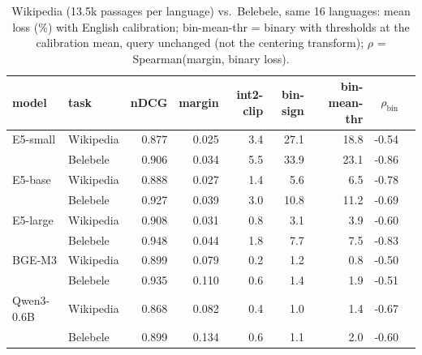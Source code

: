 \begin{table}[t]\centering\footnotesize
\begin{tabular}{llrrrrrrr}
\toprule
model & task & nDCG & margin & int2-clip & bin-sign & bin-mean-thr & $\rho_{\mathrm{bin}}$ \\
\midrule
E5-small & Wikipedia & 0.877 & 0.025 & 3.4 & 27.1 & 18.8 & -0.54 \\
 & Belebele & 0.906 & 0.034 & 5.5 & 33.9 & 23.1 & -0.86 \\
E5-base & Wikipedia & 0.888 & 0.027 & 1.4 & 5.6 & 6.5 & -0.78 \\
 & Belebele & 0.927 & 0.039 & 3.0 & 10.8 & 11.2 & -0.69 \\
E5-large & Wikipedia & 0.908 & 0.031 & 0.8 & 3.1 & 3.9 & -0.60 \\
 & Belebele & 0.948 & 0.044 & 1.8 & 7.7 & 7.5 & -0.83 \\
BGE-M3 & Wikipedia & 0.899 & 0.079 & 0.2 & 1.2 & 0.8 & -0.50 \\
 & Belebele & 0.935 & 0.110 & 0.6 & 1.4 & 1.9 & -0.51 \\
Qwen3-0.6B & Wikipedia & 0.868 & 0.082 & 0.4 & 1.0 & 1.4 & -0.67 \\
 & Belebele & 0.899 & 0.134 & 0.6 & 1.1 & 2.0 & -0.60 \\
\bottomrule
\end{tabular}
\caption{Wikipedia (13.5k passages per language) vs.\ Belebele, same 16 languages: mean loss (\%) with English calibration; bin-mean-thr = binary with thresholds at the calibration mean, query unchanged (not the centering transform); $\rho$ = Spearman(margin, binary loss).}\label{tab:wiki}
\end{table}